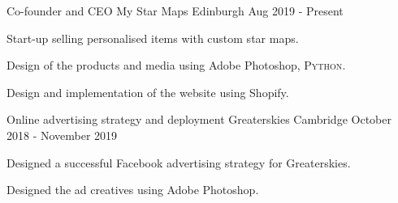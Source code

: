 

\begin{cventries}

  \cventry
    {Co-founder and CEO} %
    {My Star Maps} %
    {Edinburgh} %
    {Aug 2019 - Present} %
    {
      \begin{cvitems} %
        \item {Start-up selling personalised items with custom star maps.}
        \item {Design of the products and media using Adobe Photoshop, \textsc{Python}.}
        \item {Design and implementation of the website using Shopify.}
      \end{cvitems}
    }

  \cventry
    {Online advertising strategy and deployment} %
    {Greaterskies} %
    {Cambridge} %
    {October 2018 - November 2019} %
    {
      \begin{cvitems} %
        \item {Designed a successful Facebook advertising strategy for Greaterskies.}
        \item {Designed the ad creatives using Adobe Photoshop.}
      \end{cvitems}
    }



\end{cventries}
